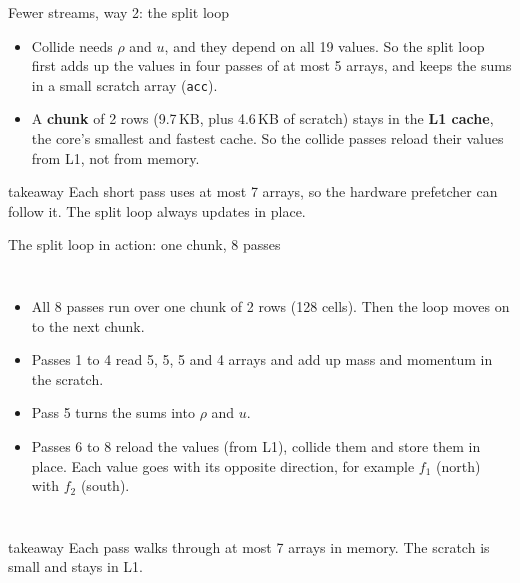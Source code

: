 \documentclass[aspectratio=169,10pt,t]{beamer}
\newcommand{\term}[1]{\textcolor{psblue!85!black}{\textbf{#1}}} %
\newcommand{\code}[1]{\texttt{#1}}
\newcommand{\takeaway}[1]{\par\vfill
  \begin{beamercolorbox}[wd=\textwidth,sep=4pt,rounded=true]{takeaway}
    \small #1
  \end{beamercolorbox}}
\begin{document}
\begin{frame}{Fewer streams, way 2: the split loop}
  \vspace{2mm}
  \centering

  \vspace{2mm}
  \raggedright
  \begin{itemize}\small
    \item Collide needs $\rho$ and $u$, and they depend on all 19 values. So the split loop first adds up the values
          in four passes of at most 5 arrays, and keeps the sums in a small scratch array (\code{acc}).
    \item A \term{chunk} of 2 rows (9.7\,KB, plus 4.6\,KB of scratch) stays in the \term{L1 cache}, the core's smallest
          and fastest cache. So the collide passes reload their values from L1, not from memory.
  \end{itemize}
  \takeaway{Each short pass uses at most 7 arrays, so the hardware prefetcher can follow it. The split loop always
    updates in place.}
\end{frame}
\begin{frame}{The split loop in action: one chunk, 8 passes}
  \begin{columns}[T,onlytextwidth]
    \vspace{0mm}
    \centering
    \vspace{3mm}
    \begin{itemize}\small
      \item All 8 passes run over one chunk of 2 rows (128 cells). Then the loop moves on to the next chunk.
      \item Passes 1 to 4 read 5, 5, 5 and 4 arrays and add up mass and momentum in the scratch.
      \item Pass 5 turns the sums into $\rho$ and $u$.
      \item Passes 6 to 8 reload the values (from L1), collide them and store them in place. Each value goes
            with its opposite direction, for example $f_1$ (north) with $f_2$ (south).
    \end{itemize}
  \end{columns}
  \takeaway{Each pass walks through at most 7 arrays in memory. The scratch is small and stays in L1.}
\end{frame}
\end{document}
